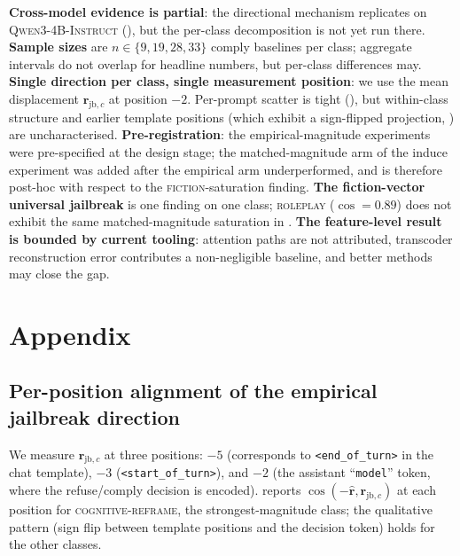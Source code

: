 \documentclass{article}
\newcommand{\rhat}{\hat{\bm{r}}}
\newcommand{\rjbc}{\bm{r}_{\mathrm{jb},c}}
\begin{document}
\textbf{Cross-model evidence is partial}: the directional mechanism
replicates on \textsc{Qwen3-4B-Instruct} (), but the
per-class decomposition is not yet run there.
\textbf{Sample sizes} are $n \in \{9, 19, 28, 33\}$ comply baselines
per class; aggregate intervals do not overlap for headline numbers,
but per-class differences may.
\textbf{Single direction per class, single measurement position}:
we use the mean displacement $\rjbc$ at position $-2$. Per-prompt
scatter is tight (), but within-class structure
and earlier template positions (which exhibit a sign-flipped
projection, ) are uncharacterised.
\textbf{Pre-registration}: the empirical-magnitude experiments were
pre-specified at the design stage; the matched-magnitude arm of the
induce experiment was added after the empirical arm underperformed,
and is therefore post-hoc with respect to the
\textsc{fiction}-saturation finding.
\textbf{The fiction-vector universal jailbreak} is one finding on
one class; \textsc{roleplay} ($\cos = 0.89$) does not exhibit the
same matched-magnitude saturation in .
\textbf{The feature-level result is bounded by current tooling}:
attention paths are not attributed, transcoder reconstruction error
contributes a non-negligible baseline, and better methods may close
the gap.




\newpage
\appendix
\onecolumn

\section*{Appendix}

\subsection{Per-position alignment of the empirical jailbreak direction}
\label{app:per-position}

We measure $\rjbc$ at three positions: $-5$ (corresponds to
\texttt{<end\_of\_turn>} in the chat template), $-3$
(\texttt{<start\_of\_turn>}), and $-2$ (the assistant
``\texttt{model}'' token, where the refuse/comply decision is
encoded).  reports
$\cos(-\rhat, \rjbc)$ at each position for
\textsc{cognitive-reframe}, the strongest-magnitude class; the
qualitative pattern (sign flip between template positions and the
decision token) holds for the other classes.
\end{document}
